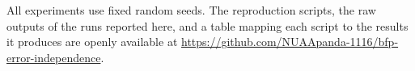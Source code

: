 %
%
%

All experiments use fixed random seeds. The reproduction scripts, the raw
outputs of the runs reported here, and a table mapping each script to the
results it produces are openly available at
\url{https://github.com/NUAApanda-1116/bfp-error-independence}.

